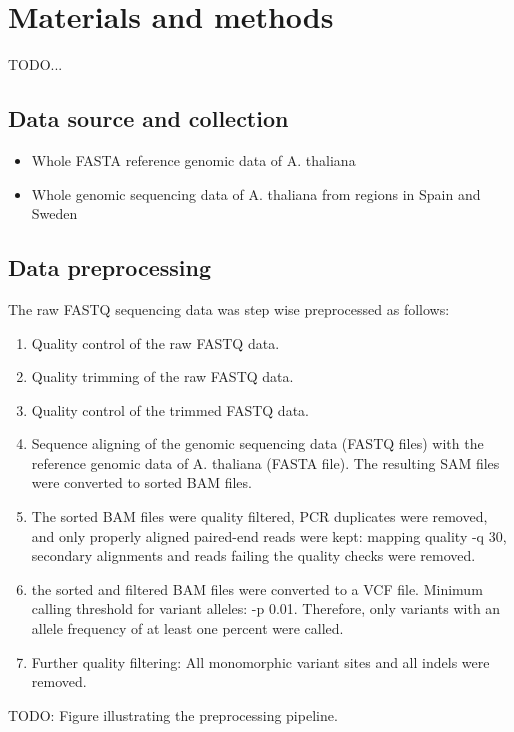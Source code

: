 \section{Materials and methods}

TODO...

\subsection{Data source and collection}

\begin{itemize}
    \item Whole FASTA reference genomic data of A. thaliana
    \item Whole genomic sequencing data of A. thaliana from regions in Spain and Sweden
\end{itemize}

\subsection{Data preprocessing}

The raw FASTQ sequencing data was step wise preprocessed as follows:

\begin{enumerate}
    \item Quality control of the raw FASTQ data.
    \item Quality trimming of the raw FASTQ data.
    \item Quality control of the trimmed FASTQ data.
    \item Sequence aligning of the genomic sequencing data (FASTQ files) with the reference genomic data of A. thaliana (FASTA file). The resulting SAM files were converted to sorted BAM files.
    \item The sorted BAM files were quality filtered, PCR duplicates were removed, and only properly aligned paired-end reads were kept: mapping quality -q 30, secondary alignments and reads failing the quality checks were removed.
    \item the sorted and filtered BAM files were converted to a VCF file. Minimum calling threshold for variant alleles: -p 0.01. Therefore, only variants with an allele frequency of at least one percent were called.
    \item Further quality filtering: All monomorphic variant sites and all indels were removed.
\end{enumerate}

TODO: Figure illustrating the preprocessing pipeline.

